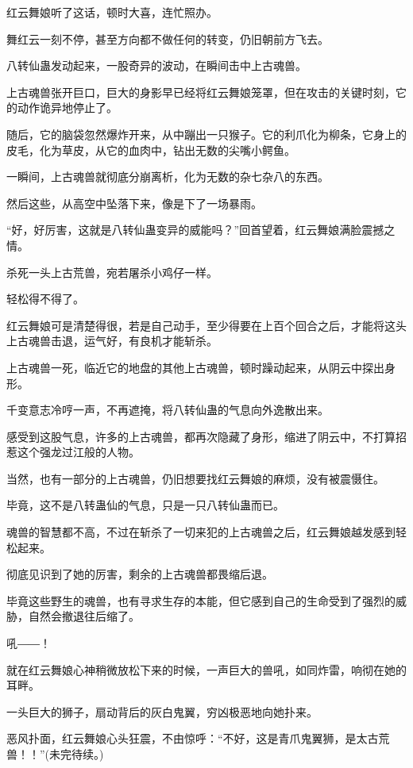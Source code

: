 \begin{this_body}
红云舞娘听了这话，顿时大喜，连忙照办。

舞红云一刻不停，甚至方向都不做任何的转变，仍旧朝前方飞去。

八转仙蛊发动起来，一股奇异的波动，在瞬间击中上古魂兽。

上古魂兽张开巨口，巨大的身影早已经将红云舞娘笼罩，但在攻击的关键时刻，它的动作诡异地停止了。

随后，它的脑袋忽然爆炸开来，从中蹦出一只猴子。它的利爪化为柳条，它身上的皮毛，化为草皮，从它的血肉中，钻出无数的尖嘴小鳄鱼。

一瞬间，上古魂兽就彻底分崩离析，化为无数的杂七杂八的东西。

然后这些，从高空中坠落下来，像是下了一场暴雨。

“好，好厉害，这就是八转仙蛊变异的威能吗？”回首望着，红云舞娘满脸震撼之情。

杀死一头上古荒兽，宛若屠杀小鸡仔一样。

轻松得不得了。

红云舞娘可是清楚得很，若是自己动手，至少得要在上百个回合之后，才能将这头上古魂兽击退，运气好，有良机才能斩杀。

上古魂兽一死，临近它的地盘的其他上古魂兽，顿时躁动起来，从阴云中探出身形。

千变意志冷哼一声，不再遮掩，将八转仙蛊的气息向外逸散出来。

感受到这股气息，许多的上古魂兽，都再次隐藏了身形，缩进了阴云中，不打算招惹这个强龙过江般的人物。

当然，也有一部分的上古魂兽，仍旧想要找红云舞娘的麻烦，没有被震慑住。

毕竟，这不是八转蛊仙的气息，只是一只八转仙蛊而已。

魂兽的智慧都不高，不过在斩杀了一切来犯的上古魂兽之后，红云舞娘越发感到轻松起来。

彻底见识到了她的厉害，剩余的上古魂兽都畏缩后退。

毕竟这些野生的魂兽，也有寻求生存的本能，但它感到自己的生命受到了强烈的威胁，自然会撤退往后缩了。

吼――！

就在红云舞娘心神稍微放松下来的时候，一声巨大的兽吼，如同炸雷，响彻在她的耳畔。

一头巨大的狮子，扇动背后的灰白鬼翼，穷凶极恶地向她扑来。

恶风扑面，红云舞娘心头狂震，不由惊呼：“不好，这是青爪鬼翼狮，是太古荒兽！！”(未完待续。)

\end{this_body}

